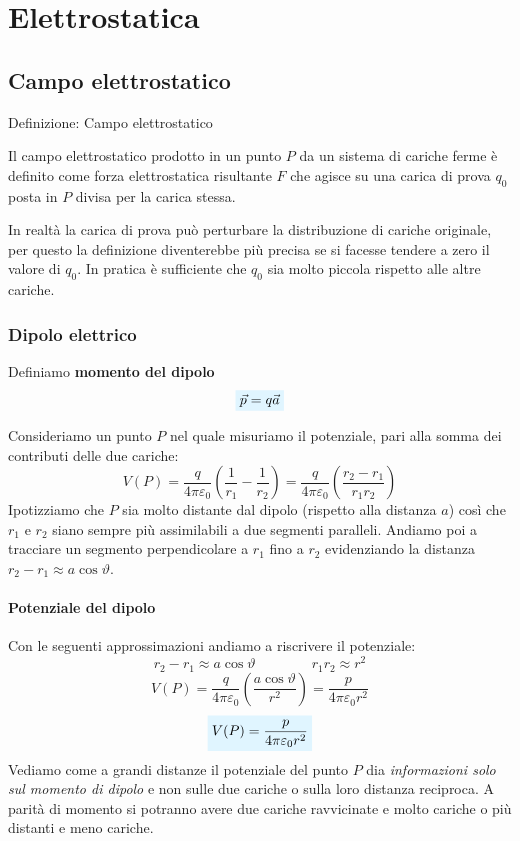 \documentclass[x11names]{report}
\newcommand{\definizione}[2]{
	\begin{center}
		\fboxsep11pt
		\colorbox{myblue}{\begin{minipage}{5.75in}
				\begin{blues}{Definizione: #1}
					#2
				\end{blues}
		\end{minipage}}
	\end{center}
}
\newcommand{\viola}[1]{%
	\colorbox{myblue}{$\displaystyle #1$}
}
\begin{document}
	

\tableofcontents
\newpage
	
\chapter{Elettrostatica}
\section{Campo elettrostatico}
\definizione{Campo elettrostatico}{
Il campo elettrostatico prodotto in un punto \(P\) da un sistema di cariche ferme è definito come forza elettrostatica risultante \(F\) che agisce su una carica di prova \(q_0\) posta in \(P\) divisa per la carica stessa.
}
In realtà la carica di prova può perturbare la distribuzione di cariche originale, per questo la definizione diventerebbe più precisa se si facesse tendere a zero il valore di \(q_0\). In pratica è sufficiente che \(q_0\) sia molto piccola rispetto alle altre cariche.
\subsection{Dipolo elettrico}
Definiamo \textbf{momento del dipolo}
\begin{equation}
	\viola{\vec{p} = q\vec{a}}
\end{equation}


Consideriamo un punto \(P\) nel quale misuriamo il potenziale, pari alla somma dei contributi delle due cariche:
\[
V(P) = \frac{q}{4\pi \varepsilon_0} \left(\frac{1}{r_1} - \frac{1}{r_2}\right) = \frac{q}{4\pi \varepsilon_0} \left(\frac{r_2 - r_1}{r_1r_2}\right)
\]
Ipotizziamo che \(P\) sia molto distante dal dipolo (rispetto alla distanza \(a\)) così che \(r_1\) e \(r_2\) siano sempre più assimilabili a due segmenti paralleli. Andiamo poi a tracciare un segmento perpendicolare a \(r_1\) fino a \(r_2\) evidenziando la distanza \(r_2 - r_1 \approx a\cos\vartheta\). 

\subsubsection{Potenziale del dipolo}
Con le seguenti approssimazioni andiamo a riscrivere il potenziale:
\[
r_2 - r_1 \approx a\cos\vartheta \qquad \qquad r_1r_2 \approx r^2
\]
\[
V(P) = \frac{q}{4\pi \varepsilon_0} \left(\frac{a\cos\vartheta}{r^2}\right) = \frac{p}{4\pi \varepsilon_0 r^2}
\]
\begin{equation}
	\viola{V(P) =\frac{p}{4\pi \varepsilon_0 r^2}}
\end{equation}
Vediamo come a grandi distanze il potenziale del punto \(P\) dia \textit{informazioni solo sul momento di dipolo} e non sulle due cariche o sulla loro distanza reciproca. A parità di momento si potranno avere due cariche ravvicinate e molto cariche o più distanti e meno cariche.
\end{document}

